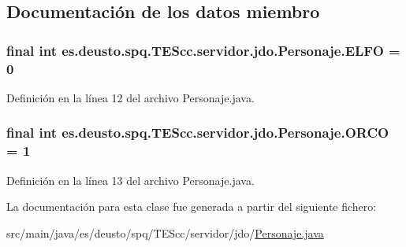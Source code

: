 \subsection{Documentación de los datos miembro}
\hypertarget{classes_1_1deusto_1_1spq_1_1_t_e_scc_1_1servidor_1_1jdo_1_1_personaje_adbeae4ec3cb0b38b82ab9f5272701c9c}{
\subsubsection[{E\+L\+F\+O}]{\setlength{\rightskip}{0pt plus 5cm}final int es.\+deusto.\+spq.\+T\+E\+Scc.\+servidor.\+jdo.\+Personaje.\+E\+L\+F\+O = 0\hspace{0.3cm}{\ttfamily [static]}}}\label{classes_1_1deusto_1_1spq_1_1_t_e_scc_1_1servidor_1_1jdo_1_1_personaje_adbeae4ec3cb0b38b82ab9f5272701c9c}


Definición en la línea 12 del archivo Personaje.\+java.

\hypertarget{classes_1_1deusto_1_1spq_1_1_t_e_scc_1_1servidor_1_1jdo_1_1_personaje_ae06424e76b975514c75a324d9cf991a3}{
\subsubsection[{O\+R\+C\+O}]{\setlength{\rightskip}{0pt plus 5cm}final int es.\+deusto.\+spq.\+T\+E\+Scc.\+servidor.\+jdo.\+Personaje.\+O\+R\+C\+O = 1\hspace{0.3cm}{\ttfamily [static]}}}\label{classes_1_1deusto_1_1spq_1_1_t_e_scc_1_1servidor_1_1jdo_1_1_personaje_ae06424e76b975514c75a324d9cf991a3}


Definición en la línea 13 del archivo Personaje.\+java.



La documentación para esta clase fue generada a partir del siguiente fichero\+:\begin{DoxyCompactItemize}
\item 
src/main/java/es/deusto/spq/\+T\+E\+Scc/servidor/jdo/\hyperlink{_personaje_8java}{Personaje.\+java}\end{DoxyCompactItemize}
